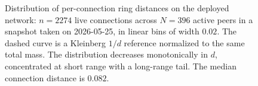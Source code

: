 \begin{figure}[t]
\begin{tikzpicture}
\end{tikzpicture}
\caption{Distribution of per-connection ring distances on the deployed
network: $n = 2274$ live connections across $N = 396$ active peers in a
snapshot taken on 2026-05-25, in linear bins of width $0.02$. The dashed
curve is a Kleinberg $1/d$ reference normalized to the same total mass.
The distribution decreases monotonically in $d$, concentrated at short
range with a long-range tail. The median connection distance is $0.082$.}
\label{fig:connection-distance}
\end{figure}
